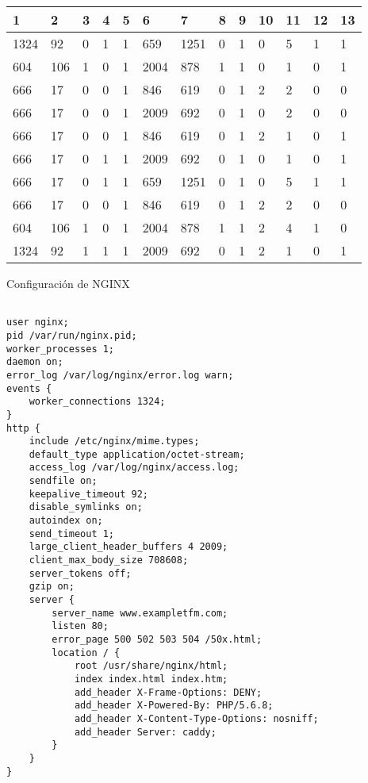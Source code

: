 \begin{table}[H]
\begin{tabular}{|l|l|l|l|l|l|l|l|l|l|l|l|l|}
\hline
\textbf{1} & \textbf{2} & \textbf{3} & \textbf{4} & \textbf{5} & \textbf{6} & \textbf{7} & \textbf{8} & \textbf{9} & \textbf{10} & \textbf{11} & \textbf{12} & \textbf{13} \\ \hline
1324  &  92  &  0  &  1  &  1  &  659  &  1251  &  0  &  1  &  0  &  {\color[HTML]{FE0000}5}  &  1  &  1 \\ \hline
604  &  106  &  1  &  0  &  1  &  2004  &  878  &  1  &  1  &  0  &  1  &  0  &  1 \\ \hline
666  &  17  &  0  &  0  &  1  &  846  &  619  &  0  &  1  &  2  &  2  &  0  &  0 \\ \hline
666  &  17  &  0  &  0  &  1  &  2009  &  692  &  0  &  1  &  0  &  2  &  0  &  0 \\ \hline
666  &  17  &  0  &  0  &  1  &  846  &  619  &  0  &  1  &  2  &  1  &  0  &  1 \\ \hline
666  &  17  &  0  &  1  &  1  &  2009  &  692  &  0  &  1  &  0  &  1  &  0  &  1 \\ \hline
666  &  17  &  0  &  1  &  1  &  659  &  1251  &  0  &  1  &  0  &  {\color[HTML]{FE0000}5}  &  1  &  1 \\ \hline
666  &  17  &  0  &  0  &  1  &  846  &  619  &  0  &  1  &  2  &  2  &  0  &  0 \\ \hline
604  &  106  &  1  &  0  &  1  &  2004  &  878  &  1  &  1  &  2  &  {\color[HTML]{FE0000}4}  &  1  &  0 \\ \hline
1324  &  92  &  1  &  1  &  1  &  2009  &  692  &  0  &  1  &  2  &  1  &  0  &  1 \\ \hline
\end{tabular}
\end{table}
Configuración de NGINX
\begin{lstlisting}[label={lst:nginx_config_random},caption={Configuración de NGINX tras 2 generaciones}]

user nginx;
pid /var/run/nginx.pid;
worker_processes 1;
daemon on;
error_log /var/log/nginx/error.log warn;
events {
    worker_connections 1324;
}
http {
    include /etc/nginx/mime.types;
    default_type application/octet-stream;
    access_log /var/log/nginx/access.log;
    sendfile on;
    keepalive_timeout 92;
    disable_symlinks on;
    autoindex on;
    send_timeout 1;
    large_client_header_buffers 4 2009;
    client_max_body_size 708608;
    server_tokens off;
    gzip on;
    server {
        server_name www.exampletfm.com;
        listen 80;
        error_page 500 502 503 504 /50x.html;
        location / {
            root /usr/share/nginx/html;
            index index.html index.htm;
            add_header X-Frame-Options: DENY;
            add_header X-Powered-By: PHP/5.6.8;
            add_header X-Content-Type-Options: nosniff;
            add_header Server: caddy;
        }
    }
}
\end{lstlisting}

